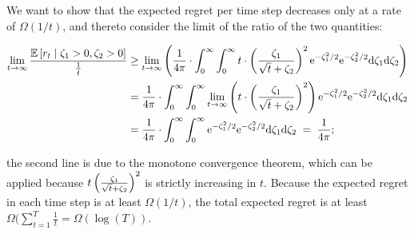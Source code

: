 We want to show that the expected regret per time step decreases only
at a rate of $\Omega(1/t)$, and thereto consider the limit of the
ratio of the two quantities:

\begin{align*}
\lim_{t \to \infty} \frac{\ExpectC{\Regret{t}}{\Noise{1} > 0, \Noise{2} > 0}}{\frac{1}{t}}
  & \geq
    \lim_{t \to \infty} \left( \frac{1}{4\pi} \cdot
    \int_{0}^{\infty} \int_{0}^{\infty}
    t \cdot \left( \frac{\Noise{1}}{\sqrt{t}+\Noise{2}} \right)^2
    \e^{-\Noise{1}^2/2} \e^{-\Noise{2}^2/2} \dd \Noise{1} \dd \Noise{2} \right) \\
  & = \frac{1}{4\pi} \cdot \int_{0}^{\infty} \int_{0}^{\infty}
    \lim_{t \to \infty}
    \left( t \cdot \left( \frac{\Noise{1}}{\sqrt{t}+\Noise{2}} \right)^2 \right)
    \e^{-\Noise{1}^2/2} \e^{-\Noise{2}^2/2} \dd \Noise{1} \dd \Noise{2} \\
  & = \frac{1}{4\pi} \cdot \int_{0}^{\infty} \int_{0}^{\infty}
    \e^{-\Noise{1}^2/2} \e^{-\Noise{2}^2/2} \dd \Noise{1} \dd \Noise{2}
  \; = \; \frac{1}{4 \pi}; 
\end{align*}

the second line is due to the monotone convergence theorem,
which can be applied because
$t \left(\frac{\Noise{1}}{\sqrt{t}+\Noise{2}}\right)^2$
is strictly increasing in $t$.
Because the expected regret in each time step is at least
$\Omega(1/t)$, the total expected regret is at least
$\Omega(\sum_{t=1}^{T}\frac{1}{t} = \Omega(\log(T))$.
